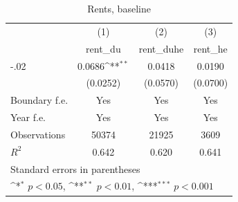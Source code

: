 \begin{table}[htbp]\centering
\def\sym#1{\ifmmode^{#1}\else\(^{#1}\)\fi}
\caption{Rents, baseline}
\begin{tabular}{l*{3}{c}}
\hline\hline
                    &\multicolumn{1}{c}{(1)}&\multicolumn{1}{c}{(2)}&\multicolumn{1}{c}{(3)}\\
                    &\multicolumn{1}{c}{rent\_du}&\multicolumn{1}{c}{rent\_duhe}&\multicolumn{1}{c}{rent\_he}\\
\hline
-.02                &      0.0686\sym{**} &      0.0418         &      0.0190         \\
                    &    (0.0252)         &    (0.0570)         &    (0.0700)         \\
[1em]
Boundary f.e.       &         Yes         &         Yes         &         Yes         \\
[1em]
Year f.e.           &         Yes         &         Yes         &         Yes         \\
\hline
Observations        &       50374         &       21925         &        3609         \\
\(R^{2}\)           &       0.642         &       0.620         &       0.641         \\
\hline\hline
\multicolumn{4}{l}{\footnotesize Standard errors in parentheses}\\
\multicolumn{4}{l}{\footnotesize \sym{*} \(p<0.05\), \sym{**} \(p<0.01\), \sym{***} \(p<0.001\)}\\
\end{tabular}
\end{table}
